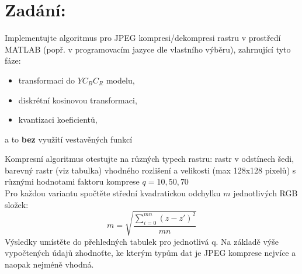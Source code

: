 \section*{Zadání:}

Implementujte algoritmus pro JPEG kompresi/dekompresi rastru v prostředí MATLAB (popř. v programovacím jazyce dle vlastního výběru), zahrnující tyto fáze:
\begin{itemize}
    \item transformaci do $YC_BC_R$ modelu,
    \item diskrétní kosinovou transformaci,
    \item kvantizaci koeficientů,
\end{itemize}
a to \textbf{bez} využití vestavěných funkcí

Kompresní algoritmus otestujte na různých typech rastru: rastr v odstínech šedi, barevný rastr (viz tabulka) vhodného rozlišení a velikosti (max 128x128 pixelů) s různými hodnotami faktoru komprese $q = 10,50,70$\\
Pro každou variantu spočtěte střední kvadratickou odchylku $m$ jednotlivých RGB složek:
$$m=\sqrt{\frac{\sum_{i=0}^{mn}(z-z')^2}{mn}}$$
Výsledky umístěte do přehledných tabulek pro jednotlivá q. Na základě výše vypočtených údajů zhodnoťte, ke kterým typům dat je JPEG komprese nejvíce a naopak nejméně vhodná.